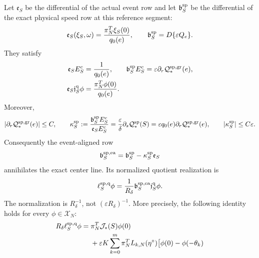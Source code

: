 \begin{theorem}
Let \(\mathfrak e_S\) be the differential of the actual event row and let
\(\mathfrak b_S^{\rm sp}\) be the differential of the exact physical
speed row at this reference segment:
\begin{equation}
 \mathfrak e_S(\xi_S,\omega)
 =\frac{\pi_N^T\xi_S(0)}{q_0(e)},
 \qquad
 \mathfrak b_S^{\rm sp}=D\{\varepsilon Q_e\}.
                                                        \label{eq:physical-speed-full-rows}
\end{equation}
They satisfy
\begin{align}
 \mathfrak e_SE_S^c&=\frac1{q_0(e)},&
 \mathfrak b_S^{\rm sp}E_S^c
 &=\varepsilon\partial_r\mathcal Q_*^{\rm sp,gr}(e),
                                                        \label{eq:physical-speed-center-columns}\\
 \mathfrak e_S\mathfrak j_S^{\rm q}\phi
 &=\frac{\pi_N^T\phi(0)}{q_0(e)}.               \label{eq:physical-speed-lifted-event-row}
\end{align}
Moreover,
\begin{equation}
 |\partial_r\mathcal Q_*^{\rm sp,gr}(e)|\le C,\qquad
 \kappa_S^{\rm sp}
 :=\frac{\mathfrak b_S^{\rm sp}E_S^c}
          {\mathfrak e_SE_S^c}
 =\frac{\varepsilon}{\delta}\partial_s\mathcal Q_*^{\rm sp}(S)
 =\varepsilon q_0(e)
       \partial_r\mathcal Q_*^{\rm sp,gr}(e),\qquad
 |\kappa_S^{\rm sp}|\le C\varepsilon.           \label{eq:physical-speed-center-shear-coefficient}
\end{equation}
Consequently the event-aligned row
\begin{equation}
 \mathfrak b_S^{\rm sp,ea}
 =\mathfrak b_S^{\rm sp}-\kappa_S^{\rm sp}\mathfrak e_S
                                                        \label{eq:physical-speed-event-aligned-row}
\end{equation}
annihilates the exact center line.  Its normalized quotient realization is
\begin{equation}
 \ell_S^{\rm sp,q}\phi
 =\frac1{R_\delta}
   \mathfrak b_S^{\rm sp,ea}\mathfrak j_S^{\rm q}\phi.
                                                        \label{eq:physical-speed-quotient-row}
\end{equation}
The normalization is \(R_\delta^{-1}\), not
\((\varepsilon R_\delta)^{-1}\).  More precisely, the following identity
holds for every \(\phi\in\mathscr X_N\):
\begin{align}
 R_\delta\ell_S^{\rm sp,q}\phi
 ={}&\pi_N^T\mathcal J_*(S)\phi(0)\notag\\
 &+\varepsilon K\sum_{k=0}^m\pi_N^TL_{k,N}(\eta^\circ)
 \bigl[\phi(0)-\phi(-\theta_k)

\end{align}
\end{theorem}
